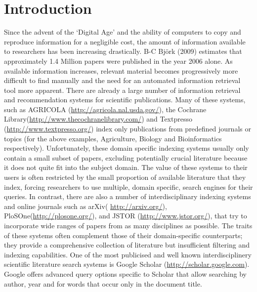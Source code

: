 \documentclass{svmult}
\begin{document}
\section{Introduction} \label{sec:1} Since the advent of the `Digital Age' and
the ability of computers to copy and reproduce information for a negligible
cost, the amount of information available to researchers has been increasing
drastically.  B-C Bj\"{o}rk (2009) estimates that approximately 1.4 Million
papers were published in the year 2006 alone\cite{bjork2009}.  As available
information increases, relevant material becomes progressively more difficult
to find manually and the need for an automated information retrieval tool more
apparent.  There are already a large number of information retrieval and
recommendation systems for scientific publications.  Many of these systems,
such as AGRICOLA (\url{http://agricola.nal.usda.gov/}), the Cochrane
Library(\url{http://www.thecochranelibrary.com/}) and Textpresso
(\url{http://www.textpresso.org/}) index only publications from predefined
journals or topics (for the above examples, Agriculture, Biology and
Bioinformatics respectively).  Unfortunately, these domain specific indexing
systems usually only contain a small subset of papers, excluding potentially
crucial literature because it does not quite fit into the subject domain. 
The value of these systems to their users is often restricted by the small
proportion of available literature that they index, forcing researchers to use
multiple, domain specific, search engines for their queries.  In contrast,
there are also a number of interdisciplinary indexing systems and online
journals such as arXiv( \url{http://arxiv.org/}),
PloSOne(\url{http://plosone.org/}), and JSTOR (\url{http://www.jstor.org/}),
that try to incorporate wide ranges of papers from as many disciplines as
possible. The traits of these systems often complement those of their
domain-specific counterparts; they provide a comprehensive collection of
literature but insufficient filtering and indexing capabilities.  One of the
most publicised and well known interdisciplinery scientific literature search
systems is Google Scholar (\url{http://scholar.google.com}). Google offers
advanced query options specific to Scholar that allow searching by author, year
and for words that occur only in the document title.
\end{document}
